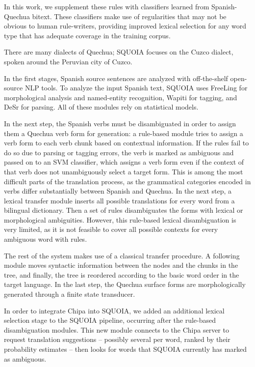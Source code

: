 In this work, we supplement these rules with classifiers learned from
Spanish-Quechua bitext.
These classifiers make use of regularities that may not
be obvious to human rule-writers, providing improved lexical selection for
any word type that has adequate coverage in the training corpus.

There are many dialects of Quechua; SQUOIA focuses on the
Cuzco dialect, spoken around the Peruvian city of Cuzco.

In the first stages, Spanish source sentences are analyzed with off-the-shelf
open-source NLP tools. To analyze the input Spanish text,
SQUOIA uses FreeLing \cite{padro12} for morphological analysis and named-entity
recognition,
Wapiti \cite{lavergne2010practical} for tagging,
and DeSr \cite{attardi-EtAl:2007:EMNLP-CoNLL2007} for parsing.
All of these modules rely on statistical models.

In the next step, the Spanish verbs must be disambiguated in order to assign
them a Quechua verb form for generation: a rule-based module tries to assign a
verb form to each verb chunk based on contextual information. If the rules fail to
do so due to parsing or tagging errors, the verb is marked as ambiguous and
passed on to an SVM classifier, which assigns a verb form even if the context
of that verb does not unambiguously select a target form. This is among the
most difficult parts of the
translation process, as the grammatical categories encoded in verbs differ
substantially between Spanish and Quechua. In the next step, a lexical transfer
module inserts all possible translations for every word from a bilingual dictionary.
Then a set of rules disambiguates the forms with lexical or morphological
ambiguities. However, this rule-based lexical disambiguation is very limited,
as it is not feasible to cover all possible contexts for every ambiguous word
with rules.

The rest of the system makes use of a classical transfer procedure. A following module
moves syntactic information between the nodes and the chunks in the tree, and
finally, the tree is reordered according to the basic word order in the target
language. In the last step, the Quechua surface forms are morphologically
generated through a finite state transducer.

In order to integrate Chipa into SQUOIA, we added an additional lexical
selection stage to the SQUOIA pipeline, occurring after the rule-based
disambiguation modules. This new module connects to the Chipa server to request
translation suggestions -- possibly several per word, ranked by their
probability estimates -- then looks for words that SQUOIA currently has marked
as ambiguous.

